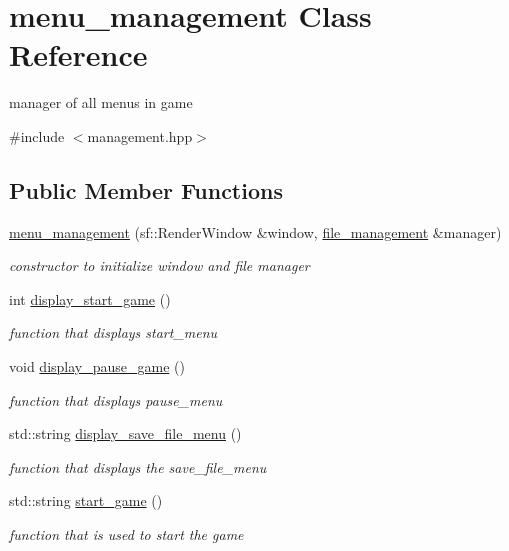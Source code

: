 \hypertarget{classmenu__management}{}\section{menu\+\_\+management Class Reference}
\label{classmenu__management}


manager of all menu\textquotesingle{}s in game  




{\ttfamily \#include $<$management.\+hpp$>$}

\subsection*{Public Member Functions}
\begin{DoxyCompactItemize}
\item 
\hyperlink{classmenu__management_a5ad91bfa81593e0678c676e158126acd}{menu\+\_\+management} (sf\+::\+Render\+Window \&window, \hyperlink{classfile__management}{file\+\_\+management} \&manager)
\begin{DoxyCompactList}\small\item\em constructor to initialize window and file manager \end{DoxyCompactList}\item 
int \hyperlink{classmenu__management_aad6e975e03cab2478f3ebec8da7eaf7d}{display\+\_\+start\+\_\+game} ()
\begin{DoxyCompactList}\small\item\em function that displays start\+\_\+menu \end{DoxyCompactList}\item 
void \hyperlink{classmenu__management_ab7aa6674e3428604073af06efe5aa791}{display\+\_\+pause\+\_\+game} ()
\begin{DoxyCompactList}\small\item\em function that displays pause\+\_\+menu \end{DoxyCompactList}\item 
std\+::string \hyperlink{classmenu__management_ac64c1eace3d955be8623a1129597dc54}{display\+\_\+save\+\_\+file\+\_\+menu} ()
\begin{DoxyCompactList}\small\item\em function that displays the save\+\_\+file\+\_\+menu \end{DoxyCompactList}\item 
std\+::string \hyperlink{classmenu__management_a92d22f059d33ccc5c3ae485804fd5fbb}{start\+\_\+game} ()
\begin{DoxyCompactList}\small\item\em function that is used to start the game \end{DoxyCompactList}\end{DoxyCompactItemize}


